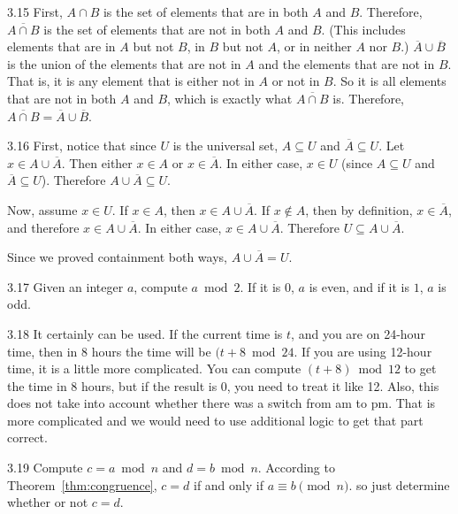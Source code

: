 \begin{RequAnswer}{3.15}
First, $A\cap B$ is the set of elements that are in both $A$ and $B$. Therefore,
$\overline{A\cap B}$  is the set of elements that are not in both $A$ and $B$.
(This includes elements that are in $A$ but not $B$, in $B$ but not $A$, or in neither $A$ nor $B$.)
$\overline{A}\cup\overline{B}$ is the union of the elements that are not in $A$ and the elements that are not in $B$.
That is, it is any element that is either not in $A$ or not in $B$. So it is all elements that are not in both $A$ and $B$,
which is exactly what $\overline{A\cap B}$ is.
Therefore, $\overline{A\cap B}= \overline{A}\cup\overline{B}$.
\end{RequAnswer}
\begin{RequAnswer}{3.16}
First, notice that since $U$ is the universal set, $A\subseteq U$ and $\overline{A}\subseteq U$.
Let $x\in A\cup \overline{A}$. Then either $x\in A$ or $x\in\overline{A}$.
In either case, $x\in U$ (since $A\subseteq U$ and $\overline{A}\subseteq U$). Therefore $A\cup \overline{A}\subseteq U$.

Now, assume $x\in U$.  If $x\in A$, then $x\in A\cup \overline{A}$.
If $x\not\in A$, then by definition, $x\in\overline{A}$, and therefore $x\in A\cup \overline{A}$.
In either case, $x\in A\cup \overline{A}$. Therefore $U\subseteq A\cup \overline{A}$.

Since we proved containment both ways, $A\cup \overline{A}=U$.
\end{RequAnswer}
\begin{RequAnswer}{3.17}
Given an integer $a$, compute $a\bmod 2$.
If it is $0$, $a$ is even, and if it is $1$, $a$ is odd.
\end{RequAnswer}
\begin{RequAnswer}{3.18}
It certainly can be used. If the current time is $t$, and you are on 24-hour time,
then in 8 hours the time will be $(t+8 \bmod 24$. If you are using 12-hour time, it is a little more complicated.
You can compute $(t+8)\bmod 12$ to get the time in 8 hours, but if the result is $0$,
you need to treat it like 12.
Also, this does not take into account whether there was a switch from am to pm.
That is more complicated and we would need to use additional logic to get that part correct.
\end{RequAnswer}
\begin{RequAnswer}{3.19}
Compute $c=a\bmod n$ and $d=b\bmod n$.
According to Theorem~\ref{thm:congruence},
$c=d$ if and only if $a\equiv b\pmod n$.
so just determine whether or not $c=d$.
\end{RequAnswer}
